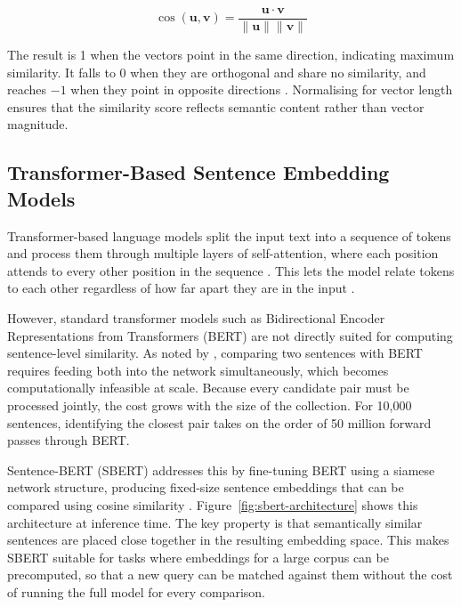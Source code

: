 \begin{equation}
    \cos(\mathbf{u}, \mathbf{v}) = 
    \frac{\mathbf{u} \cdot \mathbf{v}}{\|\mathbf{u}\| \|\mathbf{v}\|}
    \label{eq:cosine-similarity}
\end{equation}

The result is 1 when the vectors point in the same direction, indicating
maximum similarity. It falls to 0 when they are orthogonal and share no
similarity, and reaches $-1$ when they point in opposite directions
\parencite[Chapter~5.4]{jurafsky_martin2026speech_language_processing}.
Normalising for vector length ensures that the similarity score 
reflects semantic content rather than vector magnitude. 

\subsection{Transformer-Based Sentence Embedding Models}
\label{sec:transformer-based-sentence-embedding-models}

Transformer-based language models split the input text into a sequence
of tokens and process them through multiple layers of self-attention,
where each position attends to every other position in the sequence
\parencite{vaswani2023attentionneed}. This lets the model relate
tokens to each other regardless of how far apart they are in the input
\parencite{vaswani2023attentionneed}.

However, standard transformer models such as Bidirectional Encoder 
Representations from Transformers (BERT) are not directly suited for 
computing sentence-level similarity. As noted by 
\textcite{reimers2019sentence_bert_sentence_embeddings_using_siamese_bert_networks}, 
comparing two sentences with BERT requires feeding both into the 
network simultaneously, which becomes computationally infeasible at 
scale. Because every candidate pair must be processed jointly, the 
cost grows with the size of the collection. For 10,000 sentences, 
identifying the closest pair takes on the order of 50 million 
forward passes through BERT.

Sentence-BERT (SBERT) addresses this by fine-tuning BERT 
using a siamese network structure, producing fixed-size sentence 
embeddings that can be compared using cosine similarity 
\parencite{reimers2019sentence_bert_sentence_embeddings_using_siamese_bert_networks}. 
Figure~\ref{fig:sbert-architecture} shows this architecture at
inference time.
The key property is that semantically similar sentences are 
placed close together in the resulting embedding space. This 
makes SBERT suitable for tasks where embeddings for a large 
corpus can be precomputed, so that a new query can be matched 
against them without the cost of running the full model for 
every comparison.


